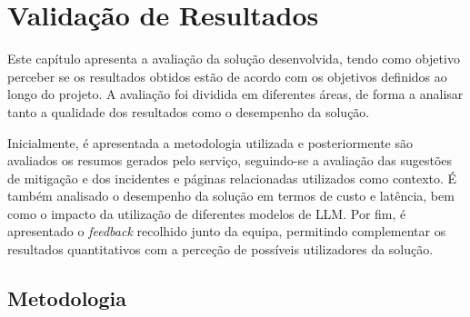 
\chapter{Validação de Resultados} %
\label{chap:Chapter7} %

	Este capítulo apresenta a avaliação da solução desenvolvida, tendo como objetivo perceber se os resultados obtidos estão de acordo com os objetivos definidos ao longo do projeto. A avaliação foi dividida em diferentes áreas, de forma a analisar tanto a qualidade dos resultados como o desempenho da solução.
	
	Inicialmente, é apresentada a metodologia utilizada e posteriormente são avaliados os resumos gerados pelo serviço, seguindo-se a avaliação das sugestões de mitigação e dos incidentes e páginas relacionadas utilizados como contexto. É também analisado o desempenho da solução em termos de custo e latência, bem como o impacto da utilização de diferentes modelos de \gls{LLM}. Por fim, é apresentado o \textit{feedback} recolhido junto da equipa, permitindo complementar os resultados quantitativos com a perceção de possíveis utilizadores da solução.

\section{Metodologia}

	
	
	
	
